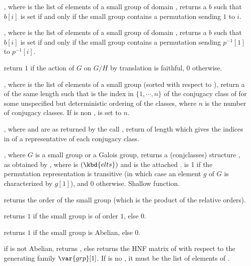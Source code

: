 , where  is the list of
elements of a small group of domain , returns a  $b$ such that
$b[i]$ is set if and only if the small group contains a permutation sending $1$
to $i$.

, where  is the list of
elements of a small group of domain , returns a  $b$ such that
$b[i]$ is set if and only if the small group contains a permutation sending
$p^{-1}[1]$ to $p^{-1}[i]$.

 return $1$ if the action
of $G$ on $G/H$ by translation is faithful, $0$ otherwise.

, where  is
the list of elements of a small group (sorted with respect to
), return a   of
the same length such that  is the index in $\{1,\cdots,n\}$  of
the conjugacy class of  for some unspecified but deterministic
ordering of the classes, where $n$ is the number of conjugacy classes. If
 is non ,  is set to $n$.

,
where  and  are as returned by the call
, return  of length 
which gives the indices in  of a representative of each conjugacy
class.

, where $G$ is a small group or a Galois group,
returns a  (conjclasses) structure ,
 as obtained by , where  is
$(\kbd{elts})$ and  is the attached
.  is 1 if the permutation representation
is transitive (in which case an element $g$ of $G$ is characterized by $g[1]$),
and 0 otherwise. Shallow function.

 returns the order of the small group
 (which is the product of the relative orders).

 returns $1$ if the small group
 is of order $1$, else $0$.

 returns $1$ if the small group
 is Abelian, else $0$.

 if  is not Abelian,
returns , else returns the HNF matrix of  with respect to
the generating family $\var{grp}[1]$. If  is no , it must
be the list of elements of .

